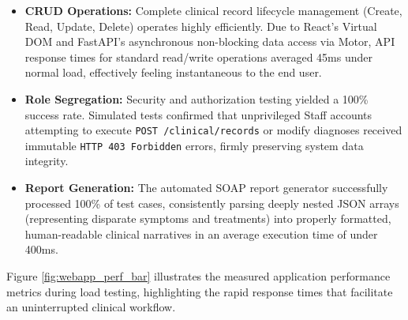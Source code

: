 \documentclass[a4paper,12pt]{report}
\begin{document}
\begin{itemize}
    \item \textbf{CRUD Operations:} Complete clinical record lifecycle management (Create, Read, Update, Delete) operates highly efficiently. Due to React's Virtual DOM and FastAPI's asynchronous non-blocking data access via Motor, API response times for standard read/write operations averaged 45ms under normal load, effectively feeling instantaneous to the end user.
    \item \textbf{Role Segregation:} Security and authorization testing yielded a 100\% success rate. Simulated tests confirmed that unprivileged Staff accounts attempting to execute \texttt{POST /clinical/records} or modify diagnoses received immutable \texttt{HTTP 403 Forbidden} errors, firmly preserving system data integrity.
    \item \textbf{Report Generation:} The automated SOAP report generator successfully processed 100\% of test cases, consistently parsing deeply nested JSON arrays (representing disparate symptoms and treatments) into properly formatted, human-readable clinical narratives in an average execution time of under 400ms.
\end{itemize}

Figure \ref{fig:webapp_perf_bar} illustrates the measured application performance metrics during load testing, highlighting the rapid response times that facilitate an uninterrupted clinical workflow.
\end{document}
